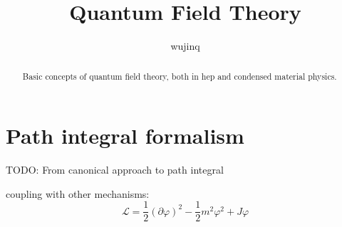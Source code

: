 \documentclass[a4paper]{article}
\title{Quantum Field Theory}
\author{wujinq}
\begin{document}
\maketitle

\begin{abstract}
    Basic concepts of quantum field theory, both in hep and condensed material physics.
\end{abstract}

\section{Path integral formalism}

TODO: From canonical approach to path integral

coupling with other mechanisms:
\[
    \mathcal{L} = \frac{1}{2} (\partial \varphi)^2 - \frac{1}{2} m^2 \varphi^2 + J \varphi
\]
\end{document}
